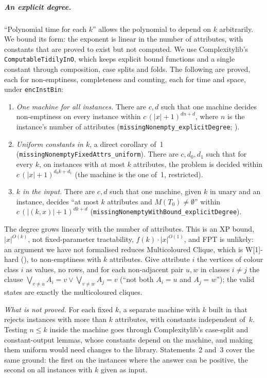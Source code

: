 \documentclass[a4paper,UKenglish,cleveref,autoref,thm-restate]{lipics-v2021}
\begin{document}
\subparagraph*{An explicit degree.}
``Polynomial time for each $k$'' allows the polynomial to depend on $k$ arbitrarily. We bound
its form: the exponent is linear in the number of attributes, with constants that are proved to
exist but not computed. We use Complexitylib's \lstinline{ComputableTidilyInO}, which keeps explicit bound functions and a
single constant through composition, case splits and folds. The following are proved, each
for non-emptiness, completeness and counting, each for time and space, under
\lstinline{encInstBin}:
\begin{enumerate}
\item \emph{One machine for all instances.} There are $c, d$ such that one machine decides
  non-emptiness on every instance within $c\,(|x|+1)^{dn+d}$, where $n$ is the instance's number
  of attributes (\lstinline{missingNonempty_explicitDegree}; ).
\item \emph{Uniform constants in $k$}, a direct corollary of~1
  (\lstinline{missingNonemptyFixedAttrs_uniform}). There are $c, d_0, d_1$ such that for every
  $k$, on instances with at most $k$ attributes, the problem is decided within
  $c\,(|x|+1)^{d_0 k + d_1}$ (the machine is the one of~1, restricted).
\item \emph{$k$ in the input.} There are $c, d$ such that one machine, given $k$ in unary and an
  instance, decides ``at most $k$ attributes and $M(T_0) \neq \emptyset$'' within
  $c\,(|(k,x)|+1)^{dk+d}$ (\lstinline{missingNonemptyWithBound_explicitDegree}).
\end{enumerate}
The degree grows linearly with the number of attributes. This is an XP bound, $|x|^{O(k)}$, not
fixed-parameter tractability, $f(k) \cdot |x|^{O(1)}$, and FPT is unlikely: an argument we have not
formalised reduces Multicoloured Clique, which is W[1]-hard (\cite[Chapter~13]{CyganEtAl2015}), to
non-emptiness with $k$ attributes. Give attribute $i$ the vertices of colour class $i$ as values,
no rows, and for each non-adjacent pair $u, w$ in classes $i \ne j$ the clause
$\bigvee_{v \ne u} A_i = v \lor \bigvee_{v \ne w} A_j = v$ (``not both $A_i = u$ and $A_j = w$'');
the valid states are exactly the multicoloured cliques.

\emph{What is not proved.} For each fixed $k$, a separate machine with $k$ built in that rejects
instances with more than $k$ attributes, with constants independent of~$k$. Testing $n \le k$
inside the machine goes through Complexitylib's case-split and constant-output lemmas, whose
constants depend on the machine, and making them uniform would need changes to the library.
Statements~2 and~3 cover the same ground: the first on the instances where the answer can be
positive, the second on all instances with $k$ given as input.
\end{document}
